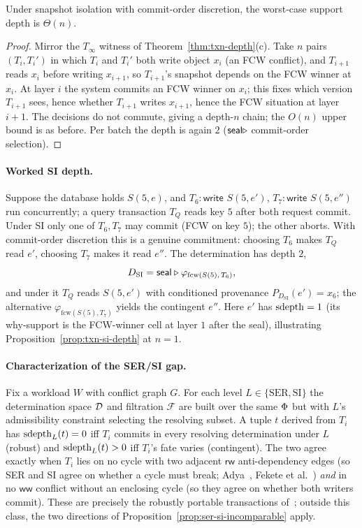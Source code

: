 \begin{proposition}
  \label{prop:txn-si-depth}
  Under snapshot isolation with commit-order discretion, the worst-case
  support depth is $\Theta(n)$.
\end{proposition}
\begin{proof}
  Mirror the $T_\infty$ witness of Theorem~\ref{thm:txn-depth}(c). Take $n$
  pairs $(T_i, T_i')$ in which $T_i$ and $T_i'$ both write object $x_i$ (an FCW
  conflict), and $T_{i+1}$ reads $x_i$ before writing $x_{i+1}$, so $T_{i+1}$'s
  snapshot depends on the FCW winner at $x_i$. At layer $i$ the system commits
  an FCW winner on $x_i$; this fixes which version $T_{i+1}$ sees, hence whether
  $T_{i+1}$ writes $x_{i+1}$, hence the FCW situation at layer $i{+}1$. The
  decisions do not commute, giving a depth-$n$ chain; the $O(n)$ upper bound is
  as before. Per batch the depth is again $2$ ($\mathsf{seal} \mathbin{\triangleright}$ commit-order
  selection).
\end{proof}

\paragraph{Worked SI depth.}
Suppose the database holds $S(5,e)$, and $T_6\!:\textsf{write } S(5,e')$,
$T_7\!:\textsf{write } S(5,e'')$ run concurrently; a query transaction $T_Q$
reads key $5$ after both request commit. Under SI only one of $T_6,T_7$ may
commit (FCW on key $5$); the other aborts. With commit-order discretion this is
a genuine commitment: choosing $T_6$ makes $T_Q$ read $e'$, choosing $T_7$ makes
it read $e''$. The determination has depth $2$,
\[
  D_{\mathrm{SI}} = \mathsf{seal} \mathbin{\triangleright} \varphi_{\mathrm{fcw}(S(5),\,T_6)},
\]
and under it $T_Q$ reads $S(5,e')$ with conditioned provenance
$P_{D_{\mathrm{SI}}}(e') = x_6$; the alternative
$\varphi_{\mathrm{fcw}(S(5),T_7)}$ yields the contingent $e''$. Here $e'$ has
$\operatorname{sdepth} = 1$ (its why-support is the FCW-winner cell at layer $1$ after the
seal), illustrating Proposition~\ref{prop:txn-si-depth} at $n = 1$.

\paragraph{Characterization of the SER/SI gap.}
Fix a workload $W$ with conflict graph $G$. For each level
$L \in \{\mathrm{SER},\mathrm{SI}\}$ the determination space $\mathcal{D}$ and
filtration $\mathcal F$ are built over the same $\Phi$ but with $L$'s
admissibility constraint selecting the resolving subset. A tuple $t$ derived
from $T_i$ has $\operatorname{sdepth}_L(t) = 0$ iff $T_i$ commits in every resolving
determination under $L$ (robust) and $\operatorname{sdepth}_L(t) > 0$ iff $T_i$'s fate varies
(contingent). The two agree exactly when $T_i$ lies on no cycle with two
adjacent $\mathsf{rw}$ anti-dependency edges (so SER and SI agree on whether a
cycle must break; Adya~\cite{adya1999weak}, Fekete et
al.~\cite{fekete2005making}) \emph{and} in no $\mathsf{ww}$ conflict without an
enclosing cycle (so they agree on whether both writers commit). These are
precisely the robustly portable transactions
of~\cite{vandevoort2025mixed}; outside this class, the two directions of
Proposition~\ref{prop:ser-si-incomparable} apply.

